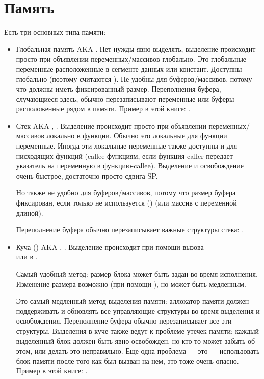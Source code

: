 ﻿\section{Память}

Есть три основных типа памяти:

\begin{itemize}
\item
Глобальная память \ac{AKA} .
Нет нужды явно выделять, выделение происходит просто при объявлении переменных/массивов 
глобально.
Это глобальные переменные расположенные в сегменте данных или констант.
Доступны глобально (поэтому считаются ).
Не удобны для буферов/массивов, потому что должны иметь фиксированный размер.
Переполнения буфера, случающиеся здесь, обычно перезаписывают переменные или буферы
расположенные рядом в памяти.
Пример в этой книге: .

\item
Стек \ac{AKA} , .
Выделение происходит просто при объявлении переменных/массивов локально в функции.%
Обычно это локальные для функции переменные.
Иногда эти локальные переменные также доступны и для нисходящих функций (\gls{callee}-функциям, если функция-\gls{caller} передает
указатель на переменную в функцию-\gls{callee}).
Выделение и освобождение очень быстрое, достаточно просто сдвига \ac{SP}.

Но также не удобно для буферов/массивов, потому что размер буфера фиксирован,
если только не используется  () (или массив с переменной длиной).

Переполнение буфера обычно перезаписывает важные структуры стека: .

\item
Куча () \ac{AKA} , .
Выделение происходит при помощи вызова \\
 или  в \Cpp.

Самый удобный метод: размер блока может быть задан во время исполнения.
Изменение размера возможно (при помощи ), но может быть медленным.

Это самый медленный метод выделения памяти: аллокатор памяти должен поддерживать и обновлять
все управляющие структуры во время выделения и освобождения.
Переполнение буфера обычно перезаписывает все эти структуры.
Выделения в куче также ведут к проблеме утечек памяти: каждый выделенный блок должен быть
явно освобожден, но кто-то может забыть об этом, или делать это неправильно.
Еще одна проблема --- это  --- использовать блок памяти после
того как  был вызван на нем, это тоже очень опасно.
Пример в этой книге:
.

\end{itemize}
